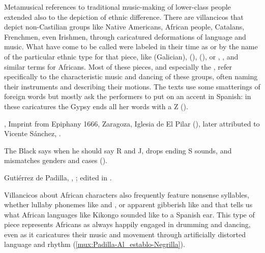 Metamusical references to traditional music-making of lower-class people
extended also to the depiction of ethnic difference.
There are villancicos that depict non-Castilian groups like Native Americans,
African people, Catalans, Frenchmen, even Irishmen, through caricatured
deformations of language and music.%
    \Autocites
    {Baker:EthnicVC}
    {Baker:PerformancePostColonial}
    {Davies:LocalContent}
    {AlvesSimao:VillancicosDeNegros}
    {Molinero:Negros}
    {Santamaria:Negrillas}
    {Goldberg:SonidosNegros}
What have come to be called  were labeled in their
time as  or by the name of the particular ethnic
type for that piece, like  (Galician), 
(),  (), or ,
, and similar terms for Africans.
Most of these pieces, and especially the , refer
specifically to the characteristic music and dancing of these groups, often
naming their instruments and describing their motions.
The texts use some smatterings of foreign words but mostly ask the performers
to put on an accent in Spanish: in these caricatures the Gypsy ends all her
words with a Z ().
\begin{Footnote}
    , Imprint from Epiphany 1666, Zaragoza,
    Iglesia de El Pilar (), later attributed to Vicente
    Sánchez, .
\end{Footnote}
The Black says when he should say R and J, drops ending S sounds, and
mismatches genders and cases ().%
\begin{Footnote}
    Gutiérrez de Padilla, ,
    ; edited in \autocite{Cashner:WLSCM32}.
\end{Footnote}
Villancicos about African characters also frequently feature nonsense
syllables, whether lullaby phonemes like  and , or apparent gibberish like  and
 that tells us what African languages like Kikongo
sounded like to a Spanish ear.
This type of piece represents Africans as always happily engaged in drumming
and dancing, even as it caricatures their music and movement through
artificially distorted language and rhythm
(\cref{mux:Padilla-Al_establo-Negrilla}).

